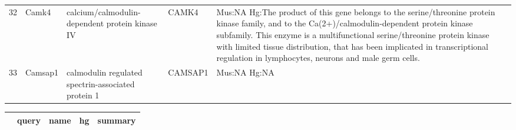 \documentclass[11pt, landscape]{article}   	%
\begin{document}
\begin{table}[ht]
\begin{tabular}{rlp{3cm}lp{12cm}}
  32 & Camk4 & calcium/calmodulin-dependent protein kinase IV & CAMK4 & Mus:NA Hg:The product of this gene belongs to the serine/threonine protein kinase family, and to the Ca(2+)/calmodulin-dependent protein kinase subfamily. This enzyme is a multifunctional serine/threonine protein kinase with limited tissue distribution, that has been implicated in transcriptional regulation in lymphocytes, neurons and male germ cells. \\ 
  33 & Camsap1 & calmodulin regulated spectrin-associated protein 1 & CAMSAP1 & Mus:NA Hg:NA \\ 

   \hline
\end{tabular}
\end{table}

\begin{table}[ht]
\centering
\tiny
\begin{tabular}{rlp{3cm}lp{12cm}}
  \hline
 & query & name & hg & summary \\ 
  \hline


\end{tabular}
\end{table}
\end{document}
